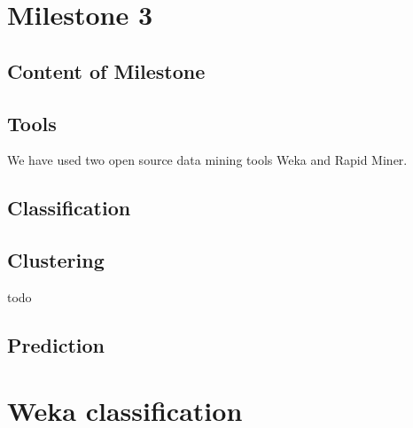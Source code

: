 


\chapter{Milestone 3} \label{cha:ml3}
    \section{Content of Milestone} 
        \label{sec:ml3_content}
    

    \section{Tools} %
    \label{sub:Tools}
    We have used two open source data mining tools Weka and Rapid Miner.
    
    

    \section{Classification} %
    \label{sec:Classification}
    

    \section{Clustering} %
    \label{sub:Clustering}
    todo

    \section{Prediction} %
    \label{sub:Prediction}
    

    \appendix
    \chapter{Weka classification} %
    \label{cha:Weka}
    
    


